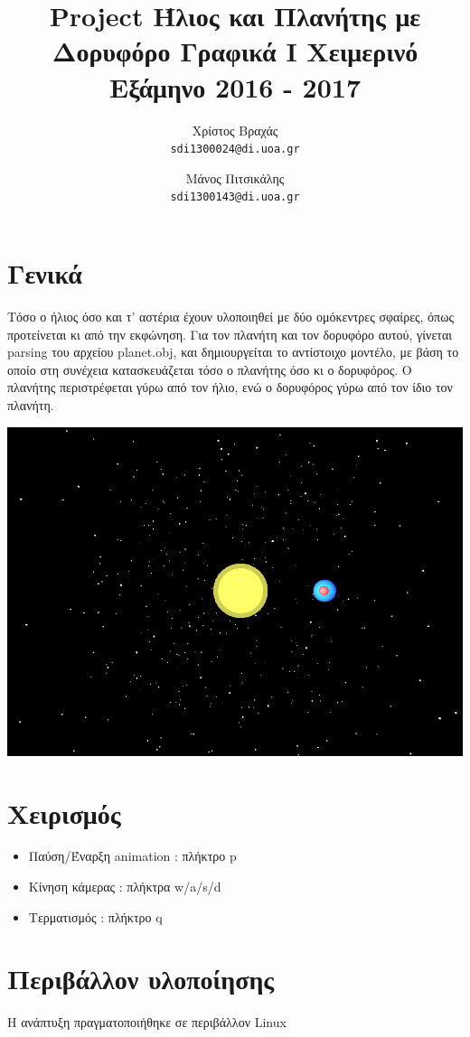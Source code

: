 \documentclass[12pt]{article}
\title{Project Ήλιος και Πλανήτης με Δορυφόρο Γραφικά Ι Χειμερινό Εξάμηνο 2016 - 2017}
\author{Χρίστος Βραχάς\\
  \texttt{sdi1300024@di.uoa.gr}
  \and Μάνος Πιτσικάλης\\
  \texttt{sdi1300143@di.uoa.gr}}
\date{}
\begin{document}
\maketitle


\section{Γενικά}

Τόσο ο ήλιος όσο και τ' αστέρια έχουν υλοποιηθεί με δύο ομόκεντρες σφαίρες, όπως προτείνεται κι από την εκφώνηση. Για τον πλανήτη και τον
δορυφόρο αυτού, γίνεται parsing του αρχείου planet.obj, και δημιουργείται το αντίστοιχο μοντέλο, με βάση το οποίο στη συνέχεια
κατασκευάζεται τόσο ο πλανήτης όσο κι ο δορυφόρος. Ο πλανήτης περιστρέφεται γύρω από τον ήλιο, ενώ ο δορυφόρος γύρω από τον ίδιο
τον πλανήτη.

\includegraphics[scale=0.5]{graphics.png}

\section{Χειρισμός}

\begin{itemize}
    \item Παύση/Έναρξη animation : πλήκτρο p
    \item Κίνηση κάμερας : πλήκτρα w/a/s/d
    \item Τερματισμός : πλήκτρο q
\end{itemize}

\section{Περιβάλλον υλοποίησης}

Η ανάπτυξη πραγματοποιήθηκε σε περιβάλλον Linux
\end{document}
